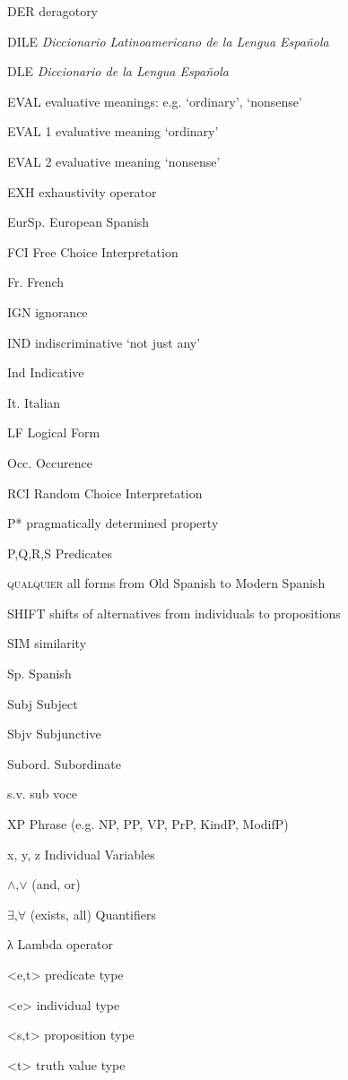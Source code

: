 \documentclass[output=paper]{langscibook}
\begin{document}
DER     deragotory

DILE   \textit{Diccionario Latinoamericano de la Lengua Española}

DLE    \textit{Diccionario de la Lengua Española}

EVAL   evaluative meanings: e.g. ‘ordinary’, ‘nonsense’

EVAL 1   evaluative meaning ‘ordinary’

EVAL 2   evaluative meaning ‘nonsense’

EXH     exhaustivity operator

EurSp.  European Spanish

FCI     Free Choice Interpretation

Fr.    French

IGN    ignorance

IND    indiscriminative ‘not just any’

Ind    Indicative

It.    Italian

LF    Logical Form

Occ.    Occurence

RCI      Random Choice Interpretation

P*     pragmatically determined property 

P,Q,R,S   Predicates

\textsc{qualquier}   all forms from Old Spanish to Modern Spanish 

SHIFT   shifts of alternatives from individuals to propositions

SIM     similarity

Sp.    Spanish

Subj    Subject

Sbjv    Subjunctive

Subord.  Subordinate

s.v.    sub voce

XP     Phrase (e.g. NP, PP, VP, PrP, KindP, ModifP)

x, y, z   Individual Variables 

${\wedge}$,${\vee}$      (and, or) 

${\exists}$,${\forall}$     (exists, all) Quantifiers

λ     Lambda operator

<e,t>     predicate type

<e>     individual type

<s,t>     proposition type

<t>     truth value type
\end{document}
